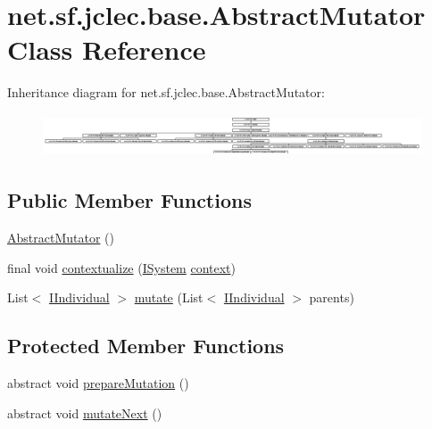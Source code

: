 \hypertarget{classnet_1_1sf_1_1jclec_1_1base_1_1_abstract_mutator}{\section{net.\-sf.\-jclec.\-base.\-Abstract\-Mutator Class Reference}
\label{classnet_1_1sf_1_1jclec_1_1base_1_1_abstract_mutator}
}
Inheritance diagram for net.\-sf.\-jclec.\-base.\-Abstract\-Mutator\-:\begin{figure}[H]
\begin{center}
\leavevmode
\includegraphics[height=1.276873cm]{classnet_1_1sf_1_1jclec_1_1base_1_1_abstract_mutator}
\end{center}
\end{figure}
\subsection*{Public Member Functions}
\begin{DoxyCompactItemize}
\item 
\hyperlink{classnet_1_1sf_1_1jclec_1_1base_1_1_abstract_mutator_a6ce8dd6a6cdcc19c003e7f40f0af9e54}{Abstract\-Mutator} ()
\item 
final void \hyperlink{classnet_1_1sf_1_1jclec_1_1base_1_1_abstract_mutator_a09e2996e9f6715d658b07d41971801c8}{contextualize} (\hyperlink{interfacenet_1_1sf_1_1jclec_1_1_i_system}{I\-System} \hyperlink{classnet_1_1sf_1_1jclec_1_1base_1_1_abstract_mutator_af0995dc3ca644cea60e43aa65085f097}{context})
\item 
List$<$ \hyperlink{interfacenet_1_1sf_1_1jclec_1_1_i_individual}{I\-Individual} $>$ \hyperlink{classnet_1_1sf_1_1jclec_1_1base_1_1_abstract_mutator_a6dc5e2ae8e27cdda9639cad2cadd6fba}{mutate} (List$<$ \hyperlink{interfacenet_1_1sf_1_1jclec_1_1_i_individual}{I\-Individual} $>$ parents)
\end{DoxyCompactItemize}
\subsection*{Protected Member Functions}
\begin{DoxyCompactItemize}
\item 
abstract void \hyperlink{classnet_1_1sf_1_1jclec_1_1base_1_1_abstract_mutator_ad12e6a2be8fb6082255ce8f399c9b166}{prepare\-Mutation} ()
\item 
abstract void \hyperlink{classnet_1_1sf_1_1jclec_1_1base_1_1_abstract_mutator_acad18bae2458fe06812b321d43f3499e}{mutate\-Next} ()
\end{DoxyCompactItemize}
